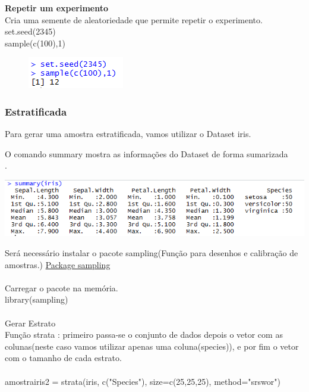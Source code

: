 \textbf{Repetir um experimento}
\\Cria uma semente de aleatoriedade que permite repetir o experimento.
\\set.seed(2345)
\\sample(c(100),1)

	\begin{figure}[h!]
	\includegraphics[scale=1.0]{cap1/Amostragem/AleatoriaSimplesRAmostraSeed.png} 
	\end{figure}

\newpage

\subsubsection{Estratificada}

Para gerar uma amostra estratificada, vamos utilizar o Dataset iris.

O comando summary mostra as informações do Dataset de forma sumarizada\\. 

{\centering \includegraphics[scale=0.8]{cap1/Amostragem/amostragemEstratificadaR.png} \par}

Será necessário instalar o pacote sampling(Função para desenhos e calibração de amostras.)
\href{https://cran.r-project.org/web/packages/sampling/index.html}{Package sampling}
\\\\
Carregar o pacote na memória.
\\library(sampling)
\\\\
Gerar Estrato 
\\
Função strata : primeiro passa-se o conjunto de dados depois o vetor com as 
colunas(neste caso vamos utilizar apenas uma coluna(species)), e por fim o vetor 
com o tamanho de cada estrato.
\\\\
amostrairis2 = strata(iris, c("Species"), size=c(25,25,25), method="srswor")\\

